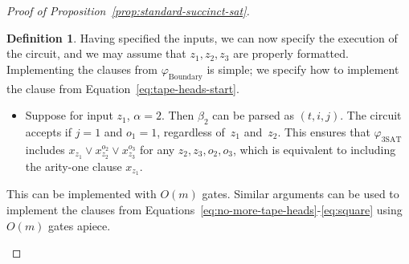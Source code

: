 \documentclass[11pt]{article}
\theoremstyle{definition}
\newtheorem{definition}[theorem]{Definition}
\begin{document}
\begin{proof}[Proof of Proposition~\ref{prop:standard-succinct-sat}]
\begin{definition}
  Having specified the inputs, we can now specify the execution of the circuit,
  and we may assume that $z_1, z_2, z_3$ are properly formatted.
  Implementing the clauses from $\varphi_{\mathrm{Boundary}}$ is simple; we
  specify how to implement the clause from Equation~\eqref{eq:tape-heads-start}.
  \begin{itemize}
  \item Suppose for input $z_1$, $\alpha = 2$.
    Then $\beta_2$ can be parsed as $(t, i, j)$.
    The circuit accepts if $j = 1$ and $o_1 = 1$, regardless of~$z_1$ and~$z_2$.
    This ensures that $\varphi_{\mathrm{3SAT}}$ includes $x_{z_1} \lor
    x_{z_2}^{o_2} \lor x_{z_3}^{o_3}$ for any $z_2, z_3, o_2, o_3$, which is
    equivalent to including the arity-one clause $x_{z_1}$.
  \end{itemize}
  This can be implemented with $O(m)$ gates.
  Similar arguments can be used to implement the clauses from
  Equations~\eqref{eq:no-more-tape-heads}-\eqref{eq:square} using $O(m)$ gates
  apiece.


\end{definition}
\end{proof}
\end{document}
